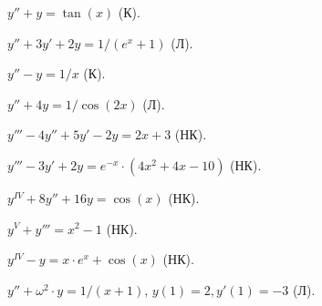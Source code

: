 \begin{problem}
	$y'' + y = \tan (x)$ (К).
\end{problem}

\begin{problem}
	$y'' + 3 y' + 2 y = 1 / (e^x + 1)$ (Л).
\end{problem}

\begin{problem}
	$y'' - y = 1 / x$ (К).
\end{problem}

\begin{problem}
	$y'' + 4 y = 1 / \cos (2 x)$ (Л).
\end{problem}

\begin{problem}
	$y''' - 4 y'' + 5 y' - 2 y = 2 x + 3$ (НК).
\end{problem}

\begin{problem}
	$y''' - 3 y' + 2 y = e^{-x} \cdot (4 x^2 + 4 x - 10)$ (НК).
\end{problem}

\begin{problem}
	$y^{IV} + 8 y'' + 16 y = \cos (x)$ (НК).
\end{problem}

\begin{problem}
	$y^V + y''' = x^2 - 1$ (НК).
\end{problem}

\begin{problem}
	$y^{IV} - y = x \cdot e^x + \cos (x)$ (НК).
\end{problem}

\begin{problem}
	$y'' + \omega^2 \cdot y = 1 / (x + 1)$, $y(1) = 2, y'(1) = -3$ (Л).
\end{problem}
